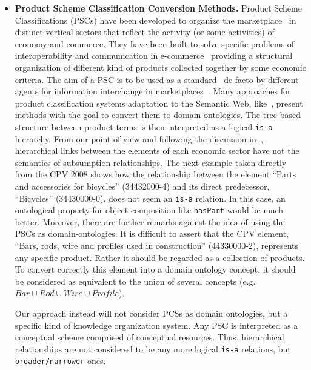 \begin{itemize}
 \item \textbf{Product Scheme Classification Conversion Methods.}  Product Scheme Classifications (PSCs) have been developed to 
 organize the marketplace~\cite{Leukel-automating,Leukel-comparative} in distinct vertical sectors that reflect the 
 activity (or some activities) of economy and commerce. They have been built to solve specific problems of 
 interoperability and communication in e-commerce~\cite{Leukel-findings} providing a structural organization 
 of different kind of products collected together by some economic criteria. The aim of a PSC is to be used 
 as a standard~\cite{Leukel-standard} de facto by different agents for information interchange 
 in marketplaces~\cite{FenselOmel2001,FenselDing2001}. Many approaches for product classification systems adaptation to the Semantic Web, 
 like~\cite{Lonsdale:2010:ROL:1743778.1744005}, present methods with the goal to convert them to domain-ontologies. 
 The tree-based structure between product terms is then interpreted as a logical \texttt{is-a} hierarchy. 
 From our point of view and following the discussion in~\cite{Hepp:2007:POR:1256315.1256337,Hepp:2006:SWS:1128590.1128683}, hierarchical 
 links between the elements of each economic sector have not the semantics of subsumption relationships. The next example 
 taken directly from the CPV 2008 shows how the relationship between the element ``Parts and accessories for bicycles'' (34432000-4) 
 and its direct predecessor, ``Bicycles'' (34430000-0), does not seem an \texttt{is-a} relation. In this case, an ontological 
 property for object composition like \texttt{hasPart} would be much better. Moreover, there are further 
 remarks against the idea of using the PSCs as domain-ontologies. It is difficult to assert 
 that the CPV element, ``Bars, rods, wire and profiles used in construction'' (44330000-2), represents 
 any specific product. Rather it should be regarded as a collection of products. 
 To convert correctly this element into a domain ontology concept, it should be considered 
 as equivalent to the union of several concepts (e.g. $Bar \cup Rod \cup Wire \cup Profile$).
 
 Our approach instead will not consider PCSs as domain ontologies, but a specific kind of knowledge organization system. Any PSC is 
 interpreted as a conceptual scheme comprised of conceptual resources. Thus, hierarchical relationships are not 
 considered to be any more logical \texttt{is-a} relations, but \texttt{broader/narrower} ones. 

\end{itemize}
